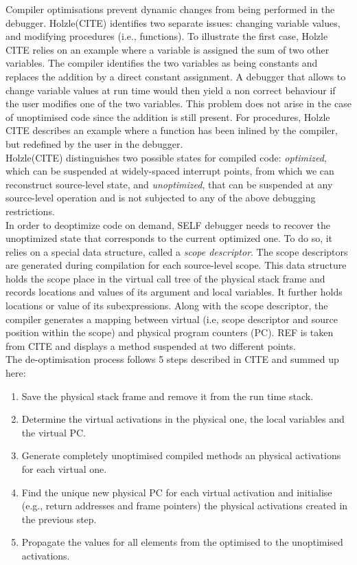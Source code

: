 Compiler optimisations prevent dynamic changes from being performed in the debugger.
Holzle(CITE) identifies two separate issues: changing variable values, and modifying procedures (i.e., functions).
To illustrate the first case, Holzle CITE relies on an example where a variable is assigned the sum of two other variables.
The compiler identifies the two variables as being constants and replaces the addition by a direct constant assignment.
A debugger that allows to change variable values at run time would then yield a non correct behaviour if the user modifies one of the two variables. 
This problem does not arise in the case of unoptimised code since the addition is still present. 
For procedures, Holzle CITE describes an example where a function has been inlined by the compiler, but redefined by the user in the debugger.\\

Holzle(CITE) distinguishes two possible states for compiled code: \textit{optimized}, which can be suspended at widely-spaced interrupt points, from which we can reconstruct source-level state, and \textit{unoptimized}, that can be suspended at any source-level operation and is not subjected to any of the above debugging restrictions.\\

In order to deoptimize code on demand, SELF debugger needs to recover the unoptimized state that corresponds to the current optimized one. 
To do so, it relies on a special data structure, called a \textit{scope descriptor}. 
The scope descriptors are generated during compilation for each source-level scope. 
This data structure holds the scope place in the virtual call tree of the physical stack frame and records locations and values of its argument and local variables. 
It further holds locations or value of its subexpressions. Along with the scope descriptor, the compiler generates a mapping between virtual (i.e, scope descriptor and source position within the scope) and physical program counters (PC). REF is taken from CITE and displays a method suspended at two different points.\\

The de-optimisation process follows 5 steps described in CITE and summed up here:
\begin{enumerate}
    \item Save the physical stack frame and remove it from the run time stack.
    \item Determine the virtual activations in the physical one, the local variables and the virtual PC.
    \item Generate completely unoptimised compiled methods an physical activations for each virtual one.
    \item Find the unique new physical PC for each virtual activation and initialise (e.g., return addresses and frame pointers) the physical activations created in the previous step.
    \item Propagate the values for all elements from the optimised to the unoptimised activations.
\end{enumerate}

